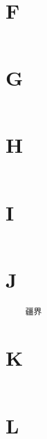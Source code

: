 \documentclass[UTF8]{../RepresentationUniverse}
\begin{document}
\section{F}
\begin{lstlisting}

\end{lstlisting}


\section{G}
\begin{lstlisting}

\end{lstlisting}


\section{H}
\begin{lstlisting}

\end{lstlisting}


\section{I}
\begin{lstlisting}

\end{lstlisting}


\section{J}
\begin{lstlisting}
    疆界

\end{lstlisting}


\section{K}
\begin{lstlisting}

\end{lstlisting}


\section{L}
\begin{lstlisting}

\end{lstlisting}
\end{document}
